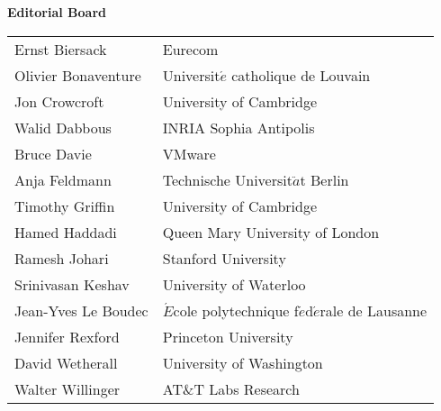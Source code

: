 
%





\begin{center}
{\Huge \textbf{Editorial Board}}


\Large 
\vspace{1in}
\begin{tabular}{ll}
Ernst Biersack &	Eurecom \\
Olivier Bonaventure &	Universit$\acute{e}$ catholique de Louvain \\
Jon Crowcroft	&  University of Cambridge \\
Walid Dabbous	  & INRIA Sophia Antipolis \\
Bruce Davie	& VMware \\
Anja Feldmann	& Technische Universit$\ddot{a}$t Berlin\\
Timothy Griffin	& University of Cambridge \\
Hamed Haddadi &	Queen Mary University of London\\
Ramesh Johari	 & Stanford University\\
Srinivasan Keshav &	University of Waterloo\\
Jean-Yves Le Boudec	& $\acute{E}$cole polytechnique f$\acute{e}$d$\acute{e}$rale de Lausanne\\
Jennifer Rexford &	Princeton University\\
David Wetherall	& University of Washington\\
Walter Willinger	& AT\&T Labs Research\\
\end{tabular}
\end{center}


\newpage



